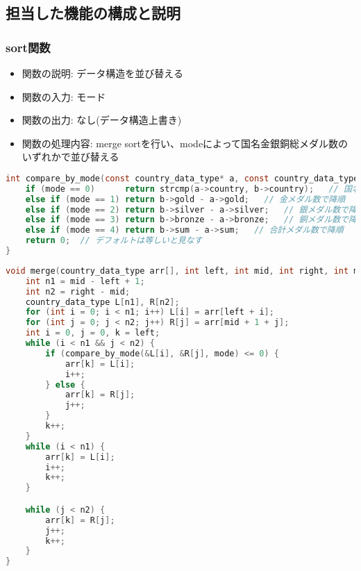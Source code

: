 \documentclass[a4paper,11pt]{jsarticle}
\begin{document}
\newpage


\subsection*{担当した機能の構成と説明}

\subsubsection*{sort関数}
\begin{itemize}
    \item 関数の説明: データ構造を並び替える
    \item 関数の入力: モード
    \item 関数の出力: なし(データ構造上書き)
    \item 関数の処理内容: merge sortを行い、modeによって国名金銀銅総メダル数のいずれかで並び替える
\end{itemize}

\begin{lstlisting}[caption=比較関数, label=sort1, language=C]
int compare_by_mode(const country_data_type* a, const country_data_type* b, int mode) {
    if (mode == 0)      return strcmp(a->country, b->country);   // 国名で昇順
    else if (mode == 1) return b->gold - a->gold;   // 金メダル数で降順
    else if (mode == 2) return b->silver - a->silver;   // 銀メダル数で降順
    else if (mode == 3) return b->bronze - a->bronze;   // 銅メダル数で降順
    else if (mode == 4) return b->sum - a->sum;   // 合計メダル数で降順
    return 0;  // デフォルトは等しいと見なす
}
\end{lstlisting}

\begin{lstlisting}[caption=マージ関数, label=sort2, language=C]
void merge(country_data_type arr[], int left, int mid, int right, int mode) {
    int n1 = mid - left + 1;
    int n2 = right - mid;
    country_data_type L[n1], R[n2];
    for (int i = 0; i < n1; i++) L[i] = arr[left + i];
    for (int j = 0; j < n2; j++) R[j] = arr[mid + 1 + j];
    int i = 0, j = 0, k = left;
    while (i < n1 && j < n2) {
        if (compare_by_mode(&L[i], &R[j], mode) <= 0) {
            arr[k] = L[i];
            i++;
        } else {
            arr[k] = R[j];
            j++;
        }
        k++;
    }
    while (i < n1) {
        arr[k] = L[i];
        i++;
        k++;
    }

    while (j < n2) {
        arr[k] = R[j];
        j++;
        k++;
    }
}
\end{lstlisting}
\end{document}
